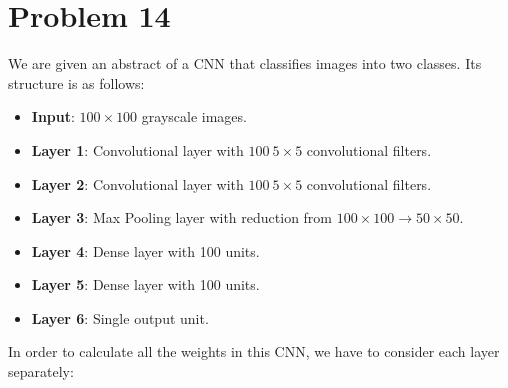 \section{Problem 14}

We are given an abstract of a CNN that classifies images into two classes. Its structure is as follows:
\begin{itemize}
	\item \textbf{Input}: $100 \times 100$ grayscale images.
	\item \textbf{Layer 1}: Convolutional layer with $100 \ 5\times 5$ convolutional filters.
	\item \textbf{Layer 2}: Convolutional layer with $100 \ 5\times 5$ convolutional filters.
	\item \textbf{Layer 3}: Max Pooling layer with reduction from $100 \times 100 \rightarrow 50 \times 50$.
	\item \textbf{Layer 4}: Dense layer with 100 units.
	\item \textbf{Layer 5}: Dense layer with 100 units.
	\item \textbf{Layer 6}: Single output unit.
\end{itemize}

In order to calculate all the weights in this CNN, we have to consider each layer separately:\\

